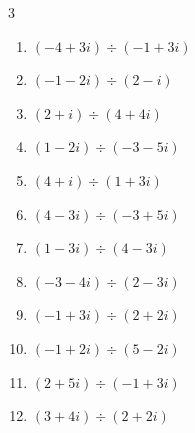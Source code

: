 \begin{multicols}{3}
\begin{enumerate}
        \phantom{$\displaystyle =5$}

  \item $\displaystyle (-4+3i)\div(-1+3i)$


  \item $\displaystyle (-1-2i)\div(2-i)$

        \phantom{$\displaystyle =-i$}

  \item $\displaystyle (2+i)\div(4+4i)$


  \item $\displaystyle (1-2i)\div(-3-5i)$


  \item $\displaystyle (4+i)\div(1+3i)$


  \item $\displaystyle (4-3i)\div(-3+5i)$


  \item $\displaystyle (1-3i)\div(4-3i)$


\columnbreak %

  \item $\displaystyle (-3-4i)\div(2-3i)$


  \item $\displaystyle (-1+3i)\div(2+2i)$


  \item $\displaystyle (-1+2i)\div(5-2i)$


  \item $\displaystyle (2+5i)\div(-1+3i)$


  \item $\displaystyle (3+4i)\div(2+2i)$


\end{enumerate}
\end{multicols}
